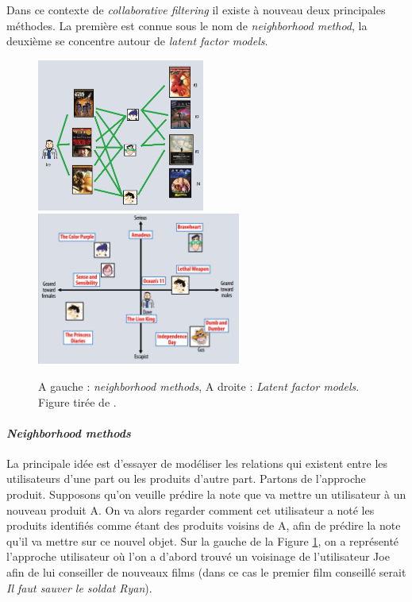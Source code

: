 \documentclass[10pt,a4paper]{article}
\begin{document}
Dans ce contexte de \textit{collaborative filtering} il existe à nouveau deux principales méthodes. La première est connue sous le nom de \textit{neighborhood method}, la deuxième se concentre autour de \textit{latent factor models}.

\begin{figure}[ht!]
\begin{center}
\includegraphics[height=5cm]{fig/neighboor_representation.png}
\includegraphics[height=5cm]{fig/factor_representation.png}
\caption{\label{nmet} A gauche : \textit{neighborhood methods}, A droite : \textit{Latent factor models}. Figure tirée de \cite{koren}.}
\end{center}
\end{figure}


\paragraph{\textit{Neighborhood methods}}

La principale idée est d'essayer de modéliser les relations qui existent entre les utilisateurs d'une part ou les produits d'autre part. Partons de l'approche produit. Supposons qu'on veuille prédire la note que va mettre un utilisateur à un nouveau produit A. On va alors regarder comment cet utilisateur a noté les produits identifiés comme étant des produits voisins de A, afin de prédire la note qu'il va mettre sur ce nouvel objet. Sur la gauche de la Figure \ref{nmet}, on a représenté l'approche utilisateur où l'on a d'abord trouvé un voisinage de l'utilisateur Joe afin de lui conseiller de nouveaux films (dans ce cas le premier film conseillé serait \textit{Il faut sauver le soldat Ryan}).
\end{document}
